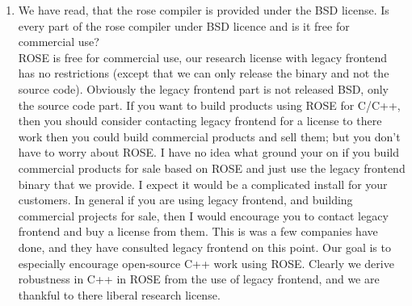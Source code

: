 \begin{enumerate}
The AST Rewrite Mechanism functions to use are the 
{\indent
{\mySmallFontSize
\begin{verbatim}
     LowLevelRewrite::remove ( SgStatement* astNode )
\end{verbatim}
}}
and 
{\indent
{\mySmallFontSize
\begin{verbatim}
     LowLevelRewrite::insert ( SgStatement* targetStatement, SgStatementPtrList newStatementList, bool insertBeforeNode ).
\end{verbatim}
}}

These will automatically disassociate any {\tt cpp} directives and comments
from the surrounding statements and reattach them so that they don't
wander around with the statements being removed, inserted, or replaced.

I will try to get to fixing up the ROSE Tutorial example so use this
interface.  Rich and I have been spending a lot of time on the Tutorial 
lately (after finishing the ROSE User Manual two weeks ago).  We are getting
all the documentation ready for release on the web.  This will likely 
happen in a few weeks, though all the paperwork and approvals are already
in place.

So as it is, this is a wonderful example of just what a bad idea it is
to manipulate the AST at such a low level.
It is the reason we have the AST Rewrite Mechanism -- provide the highest level
of interface required to make manipulation generally more simple.



\item  We have read, that the rose compiler is provided under the BSD license. Is every
    part of the rose compiler under BSD licence and is it free for commercial use? \\
   ROSE is free for commercial use, our research license with legacy frontend has no
restrictions (except that we can only release the binary and not the source code).
Obviously the legacy frontend part is not released BSD, only the source code part.
If you want to build products using ROSE for C/C++, then you should
consider contacting legacy frontend for a license to there work then you could
build commercial products and sell them; but you don't have to worry
about ROSE.  I have no idea what ground your on if you build commercial
products for sale based on ROSE and just use the legacy frontend binary
that we provide.  I expect it would be a complicated install for your customers. 
In general if you are using legacy frontend, and building commercial projects for sale,
then I would encourage you to contact legacy frontend and buy a license from them.
This is was a few companies have done, and they have consulted legacy frontend on this
point.  Our goal is to especially encourage open-source C++ work using ROSE.
Clearly we derive robustness in C++ in ROSE from the use of legacy frontend, and we
are thankful to there liberal research license.


\end{enumerate}

